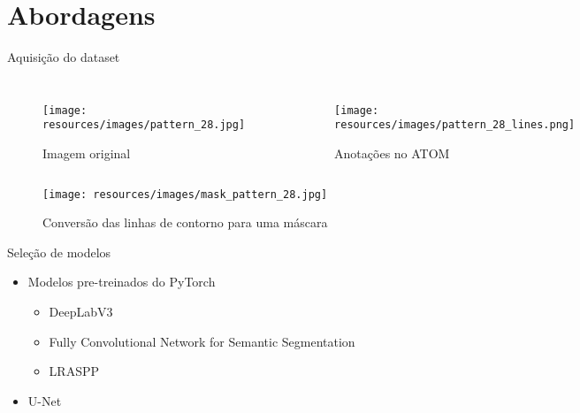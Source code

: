 \section{Abordagens}
\begin{frame}{Aquisição do dataset}
  
  \begin{columns}

      \begin{figure}[h]
          \centering
          \texttt{[image: resources/images/pattern\_28.jpg]}
          \captionsetup{labelformat=empty}
          \caption{Imagem original}
      \end{figure}

      \begin{figure}[h]
          \centering
          \texttt{[image: resources/images/pattern\_28\_lines.png]}
          \captionsetup{labelformat=empty}
          \caption{Anotações no ATOM}
      \end{figure}
  \end{columns}
      \vspace{\fill}
      \vspace{-0.2cm}



      \begin{figure}[h]
          \centering
          \texttt{[image: resources/images/mask\_pattern\_28.jpg]}
          \captionsetup{labelformat=empty}
          \caption{Conversão das linhas de contorno para uma máscara}
      \end{figure}
\end{frame}
\begin{frame}[c]{Seleção de modelos}{}

    \begin{itemize}
          \item Modelos pre-treinados do PyTorch
          \begin{itemize}
            \item DeepLabV3
            \item Fully Convolutional Network for Semantic Segmentation
            \item LRASPP
          \end{itemize}
          \item U-Net
    \end{itemize}

\end{frame}

